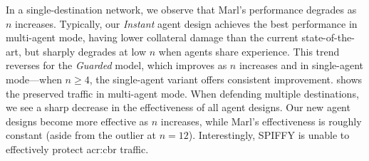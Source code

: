 %	
%
%	
%
%	

In a single-destination network, we observe that Marl's performance degrades as $n$ increases.
Typically, our \emph{Instant} agent design achieves the best performance in multi-agent mode, having lower collateral damage than the current state-of-the-art, but sharply degrades at low $n$ when agents share experience.
This trend reverses for the \emph{Guarded} model, which improves as $n$ increases and in single-agent mode---when $n\ge4$, the single-agent variant offers consistent improvement.
 shows the preserved traffic in multi-agent mode.
When defending multiple destinations, we see a sharp decrease in the effectiveness of all agent designs.
Our new agent designs become more effective as $n$ increases, while Marl's effectiveness is roughly constant (aside from the outlier at $n=12$).
Interestingly, SPIFFY is unable to effectively protect \gls{acr:cbr} traffic.

